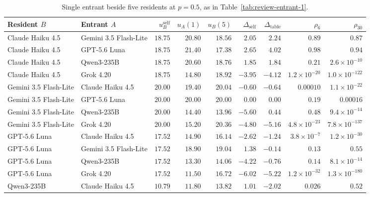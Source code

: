 \begin{table}[!htbp]
\caption{Single entrant beside five residents at $p=0.5$, as in Table~\ref{tab:review-entrant-1}.}
\label{tab:review-entrant-2}
\centering\small\setlength{\tabcolsep}{4pt}
\begin{tabular}{@{}llrrrrrrr@{}}
\toprule
Resident $B$ & Entrant $A$ & $u_B^{\mathrm{self}}$ & $u_A(1)$ & $u_B(5)$ & $\Delta_{\mathrm{self}}$ & $\Delta_{\mathrm{table}}$ & $\rho_6$ & $\rho_{30}$ \\
\midrule
Claude Haiku 4.5 & Gemini 3.5 Flash-Lite & $18.75$ & $20.80$ & $18.56$ & $2.05$ & $2.24$ & $0.89$ & $0.87$ \\
Claude Haiku 4.5 & GPT-5.6 Luna & $18.75$ & $21.40$ & $17.38$ & $2.65$ & $4.02$ & $0.98$ & $0.94$ \\
Claude Haiku 4.5 & Qwen3-235B & $18.75$ & $20.60$ & $18.76$ & $1.85$ & $1.84$ & $0.21$ & $2.6\times10^{-10}$ \\
Claude Haiku 4.5 & Grok 4.20 & $18.75$ & $14.80$ & $18.92$ & $-3.95$ & $-4.12$ & $1.2\times10^{-20}$ & $1.0\times10^{-122}$ \\
\addlinespace[2pt]
Gemini 3.5 Flash-Lite & Claude Haiku 4.5 & $20.00$ & $19.40$ & $20.04$ & $-0.60$ & $-0.64$ & $0.00010$ & $1.1\times10^{-22}$ \\
Gemini 3.5 Flash-Lite & GPT-5.6 Luna & $20.00$ & $20.00$ & $20.00$ & $0.00$ & $0.00$ & $0.19$ & $0.00016$ \\
Gemini 3.5 Flash-Lite & Qwen3-235B & $20.00$ & $14.40$ & $13.96$ & $-5.60$ & $0.44$ & $0.48$ & $9.4\times10^{-14}$ \\
Gemini 3.5 Flash-Lite & Grok 4.20 & $20.00$ & $15.20$ & $20.36$ & $-4.80$ & $-5.16$ & $4.8\times10^{-23}$ & $7.8\times10^{-137}$ \\
\addlinespace[2pt]
GPT-5.6 Luna & Claude Haiku 4.5 & $17.52$ & $14.90$ & $16.14$ & $-2.62$ & $-1.24$ & $3.8\times10^{-7}$ & $1.2\times10^{-30}$ \\
GPT-5.6 Luna & Gemini 3.5 Flash-Lite & $17.52$ & $18.90$ & $19.04$ & $1.38$ & $-0.14$ & $0.13$ & $0.55$ \\
GPT-5.6 Luna & Qwen3-235B & $17.52$ & $13.30$ & $14.06$ & $-4.22$ & $-0.76$ & $0.14$ & $8.1\times10^{-14}$ \\
GPT-5.6 Luna & Grok 4.20 & $17.52$ & $11.50$ & $16.72$ & $-6.02$ & $-5.22$ & $1.2\times10^{-32}$ & $1.3\times10^{-180}$ \\
\addlinespace[2pt]
Qwen3-235B & Claude Haiku 4.5 & $10.79$ & $11.80$ & $13.82$ & $1.01$ & $-2.02$ & $0.026$ & $0.52$ \\

\end{tabular}
\end{table}
